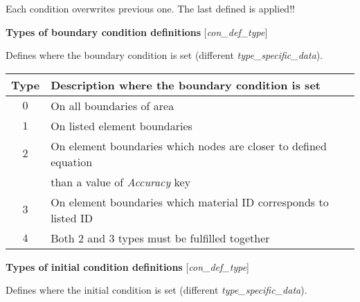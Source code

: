 \documentclass[a4paper]{article}
\begin{document}
\normalsize
\vspace{-20pt}

\begin{flushleft}
Each condition overwrites previous one. The last defined is applied!!
\end{flushleft}



\begin{flushleft}
\textbf{Types of boundary condition definitions} [\textit{con\_def\_type}]
\end{flushleft}
\vspace{-10pt}
Defines where the boundary condition is set (different \textit{type\_specific\_data}).
\vspace{-5pt}

\begin{table}[ht]

		\begin{tabular}{||c|l||}
				\hline
				Type				&	Description where the boundary condition is set\\\hline\hline
				$0$					&	On all boundaries of area\\\hline
				$1$					&	On listed element boundaries\\\hline
				$2$					&	On element boundaries which nodes are closer to defined equation\\ 
										& than a value of \textit{Accuracy} key\\\hline
		  	$3$					&	On element boundaries which material ID corresponds to listed ID\\\hline
		  	$4$					&	Both 2 and 3 types must be fulfilled together\\\hline
		\end{tabular}
\end{table}

\begin{flushleft}
\textbf{Types of initial condition definitions} [\textit{con\_def\_type}]
\end{flushleft}

\vspace{-10pt}
Defines where the initial condition is set (different \textit{type\_specific\_data}).
\vspace{-5pt}
\end{document}
